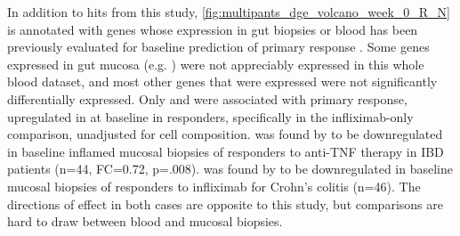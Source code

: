 In addition to hits from this study, \cref{fig:multipants_dge_volcano_week_0_R_N} is annotated with genes whose expression in gut biopsies or blood has been previously evaluated for baseline prediction of primary response \autocite{arijs2009MucosalGeneSignatures,arijs2010PredictiveValueEpithelial,verstockt2019LowTREM1Expression,salvador-martin2020GeneSignaturesEarly}.
Some genes expressed in gut mucosa (e.g. ) were not appreciably expressed in this whole blood dataset, 
and most other genes that were expressed were not significantly differentially expressed.
Only  and  were associated with primary response, upregulated in at baseline in responders, specifically in the infliximab-only comparison, unadjusted for cell composition.
 was found by \textcite{verstockt2019LowTREM1Expression} to be downregulated in baseline inflamed mucosal biopsies of responders to anti-\gls{TNF} therapy in \gls{IBD} patients (n=44, FC=0.72, p=.008).
 was found by \textcite{arijs2009MucosalGeneSignatures} to be downregulated in baseline mucosal biopsies of responders to infliximab for Crohn's colitis (n=46).
The directions of effect in both cases are opposite to this study, but comparisons are hard to draw between blood and mucosal biopsies.

